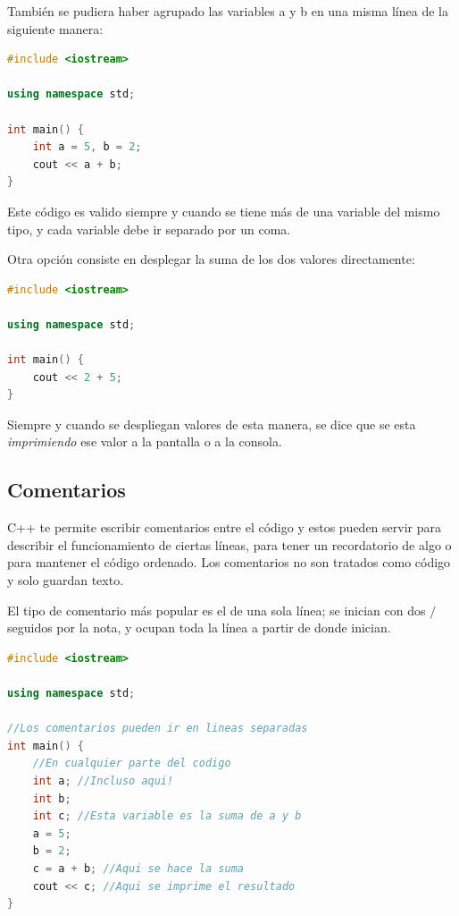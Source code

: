 \documentclass{article}
\begin{document}
También se pudiera haber agrupado las variables a y b en una misma línea de la siguiente manera:

\begin{lstlisting}[language=C++, title=¿El mismo programa?]
#include <iostream>

using namespace std;

int main() {
	int a = 5, b = 2;
	cout << a + b;
}
\end{lstlisting}

Este código es valido siempre y cuando se tiene más de una variable del mismo tipo, y cada variable debe ir separado por un coma.

Otra opción consiste en desplegar la suma de los dos valores directamente:

\begin{lstlisting}[language=C++, title=¿El mismo programa?]
#include <iostream>

using namespace std;

int main() {
	cout << 2 + 5;
}
\end{lstlisting}

Siempre y cuando se despliegan valores de esta manera, se dice que se esta \textit{imprimiendo} ese valor a la pantalla o a la consola.

\subsection{Comentarios}

C++ te permite escribir comentarios entre el código y estos pueden servir para describir el funcionamiento de ciertas líneas, para tener un recordatorio de algo o para mantener el código ordenado. Los comentarios no son tratados como código y solo guardan texto.

El tipo de comentario más popular es el de una sola línea; se inician con dos $/$ seguidos por la nota, y ocupan toda la línea a partir de donde inician.

\begin{lstlisting}[language=C++, title=Comentarios]
#include <iostream>

using namespace std;

//Los comentarios pueden ir en lineas separadas
int main() {
	//En cualquier parte del codigo
	int a; //Incluso aqui!
	int b;
	int c; //Esta variable es la suma de a y b
	a = 5;
	b = 2;
	c = a + b; //Aqui se hace la suma
	cout << c; //Aqui se imprime el resultado
}
\end{lstlisting}
\end{document}
